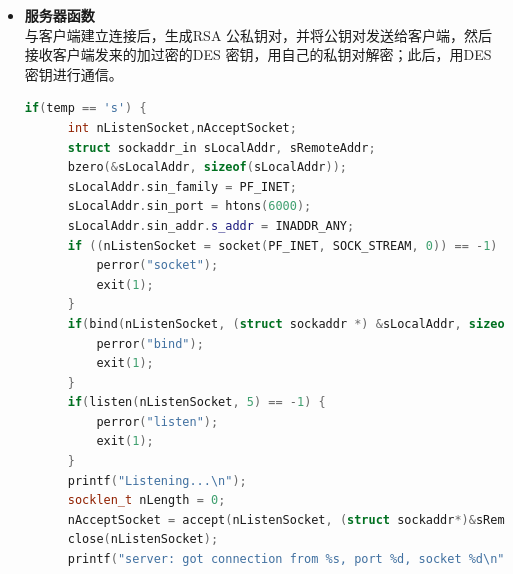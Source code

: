 \documentclass[UTF8,a4paper,10pt]{ctexart}
\begin{document}
\begin{itemize}
\begin{lstlisting}[language = C++]
    sDestAddr.sin_family = AF_INET;
    sDestAddr.sin_port = htons(SEVERPORT);
    sDestAddr.sin_addr.s_addr = inet_addr(strIPAddr);
    if(connect(nConnectSocket, (struct sockaddr *) &sDestAddr, sizeof(sDestAddr)) != 0) {
        perror("Connect");
        exit(errno);
    }
    else {
        printf("Connect Success! \n");
        char *strDesKey = new char [8];
        GerenateDesKey(strDesKey);
        printf("Create DES key success\n");
        PublicKey cRsaPublicKey;
        if(sizeof(cRsaPublicKey) == TotalRecv(nConnectSocket,(char *)&cRsaPublicKey, sizeof(cRsaPublicKey),0)) {
            printf("Successful get the RSA public Key\n");
        }
        else {
            perror("Get RSA public key ");
            exit(0);
        }
        unsigned long long nEncryptDesKey[4];
        unsigned short *pDesKey = (unsigned short *)strDesKey;
        for(int i = 0; i < 4; i++) {
            nEncryptDesKey[i] = CRsaOperate::Encry(pDesKey[i],cRsaPublicKey);
        }
        if(sizeof(unsigned long long)*4 != send(nConnectSocket, (char *)nEncryptDesKey,sizeof(unsigned long long)*4, 0)) {
            perror("Send DES key Error");
            exit(0);
        }
        else {
            printf("Successful send the encrypted DES Key\n");
        }
        printf("Begin to chat...\n");
        SecretChat(nConnectSocket,strIPAddr,strDesKey);
    }
    close(nConnectSocket);
}
  \end{lstlisting}
  \item \textbf{服务器函数} \\
  与客户端建立连接后，生成RSA 公私钥对，并将公钥对发送给客户端，然后接收客户端发来的加过密的DES 密钥，用自己的私钥对解密；此后，用DES 密钥进行通信。
  \begin{lstlisting}[language = C++]
  if(temp == 's') {
      int nListenSocket,nAcceptSocket;
      struct sockaddr_in sLocalAddr, sRemoteAddr;
      bzero(&sLocalAddr, sizeof(sLocalAddr));
      sLocalAddr.sin_family = PF_INET;
      sLocalAddr.sin_port = htons(6000);
      sLocalAddr.sin_addr.s_addr = INADDR_ANY;
      if ((nListenSocket = socket(PF_INET, SOCK_STREAM, 0)) == -1) {
          perror("socket");
          exit(1);
      }
      if(bind(nListenSocket, (struct sockaddr *) &sLocalAddr, sizeof(struct sockaddr)) == -1) {
          perror("bind");
          exit(1);
      }
      if(listen(nListenSocket, 5) == -1) {
          perror("listen");
          exit(1);
      }
      printf("Listening...\n");
      socklen_t nLength = 0;
      nAcceptSocket = accept(nListenSocket, (struct sockaddr*)&sRemoteAddr, &nLength);
      close(nListenSocket);
      printf("server: got connection from %s, port %d, socket %d\n",inet_ntoa(sRemoteAddr.sin_addr), ntohs(sRemoteAddr.sin_port), nAcceptSocket);
      

\end{lstlisting}
\end{itemize}
\end{document}
